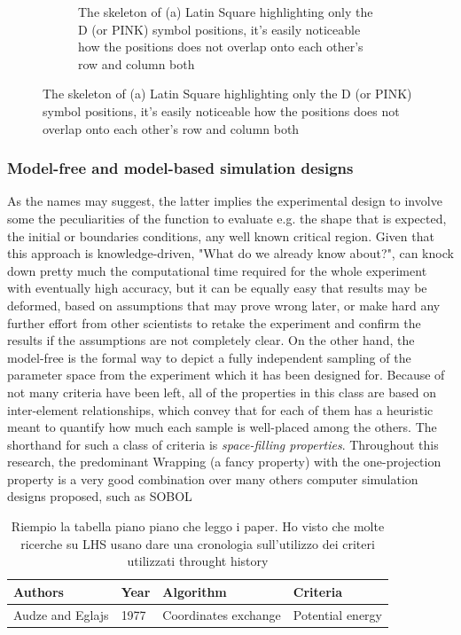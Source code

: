 \documentclass{article}
\begin{document}
\begin{figure}[h]
\begin{subfigure}[b]{0.45\textwidth}
{        	\caption{The skeleton of (a) Latin Square highlighting only the D (or PINK) symbol positions, it's easily noticeable how the positions does not overlap onto each other's row and column both}
        	\label{fig:latin_square_b}
        }
    \end{subfigure}
    \label{fig:latin_square}
\end{figure}

\subsubsection{Model-free and model-based simulation designs}
\label{subsubsec:model_free_model_based}
As the names may suggest, the latter implies the experimental design to involve some the peculiarities of the function to evaluate e.g. the shape that is expected, the initial or boundaries conditions, any well known critical region. Given that this approach is knowledge-driven, "What do we already know about?", can knock down pretty much the computational time required for the whole experiment with eventually high accuracy, but it can be equally easy that results may be deformed, based on assumptions that may prove wrong later, or make hard any further effort from other scientists to retake the experiment and confirm the results if the assumptions are not completely clear.
On the other hand, the model-free is the formal way to depict a fully independent sampling of the parameter space from the experiment which it has been designed for. Because of not many criteria have been left, all of the properties in this class are based on inter-element relationships, which convey that for each of them has a heuristic meant to quantify how much each sample is well-placed among the others. The shorthand for such a class of criteria is \textit{space-filling properties}.
Throughout this research, the predominant 
Wrapping (a fancy property) with the one-projection property is a very good combination over many others computer simulation designs proposed, such as SOBOL


\begin{table}[h!]
	\label{tab:remarkable_criterions}
    \centering
    \begin{tabularx}{\textwidth}{X X X X}
        \textbf{Authors} & \textbf{Year} & \textbf{Algorithm} & \textbf{Criteria} \\
        \hline
        {Audze and Eglajs} & 1977 & Coordinates exchange & Potential energy \\
    \end{tabularx}
    \caption{ Riempio la tabella piano piano che leggo i paper. Ho visto che molte ricerche su LHS usano dare una cronologia sull'utilizzo dei criteri utilizzati throught history}
    \label{tab:fullwidth}
\end{table}
\end{document}

